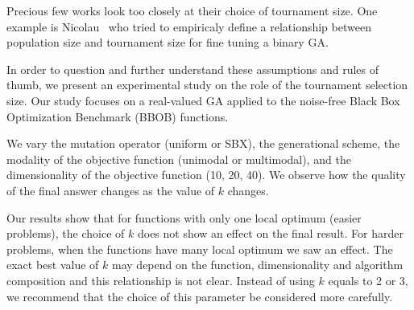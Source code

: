 
Precious few works look too closely at their choice of tournament
size. One example is Nicolau~\cite{nicolau2009application} who tried
to empiricaly define a relationship between population size and
tournament size for fine tuning a binary GA.

In order to question and further understand these assumptions and
rules of thumb, we present an experimental study on the role of the
tournament selection size. Our study focuses on a real-valued GA
applied to the noise-free Black Box Optimization Benchmark (BBOB)
functions.

We vary the mutation operator (uniform or SBX), the generational
scheme, the modality of the objective function (unimodal or
multimodal), and the dimensionality of the objective function
(10, 20, 40).  We observe how the quality of the final
answer changes as the value of $k$ changes.

Our results show that for functions with only one local optimum (easier problems), the choice of $k$ does not show an effect on the final result. For harder problems, when the functions have many local optimum we saw an effect. The exact best value of $k$ may depend on the function, dimensionality and algorithm composition and this relationship is not clear. Instead of using $k$ equals to 2 or 3, we recommend that the choice of this parameter be considered more carefully. 